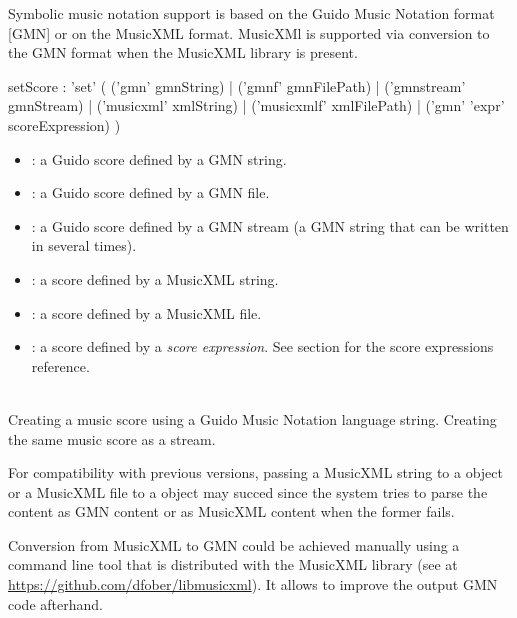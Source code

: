 \documentclass[a4paper,twoside]{report}
\begin{document}
Symbolic music notation support is based on the Guido Music Notation format [GMN] or on the MusicXML format. MusicXMl is supported via conversion to the GMN format when the MusicXML library is present.


\begin{rail}
setScore : 'set' (
	('gmn' gmnString) |
	('gmnf' gmnFilePath) |
	('gmnstream' gmnStream) |
	('musicxml' xmlString) |
	('musicxmlf' xmlFilePath) |
	('gmn' 'expr' scoreExpression)
)
\end{rail}

\begin{itemize}
\item {}: a Guido score defined by a GMN string.
\item {}: a Guido score defined by a GMN file.
\item {}: a Guido score defined by a GMN stream (a GMN string that can be written in several times).
\item {}: a score defined by a MusicXML string.
\item {}: a score defined by a MusicXML file.
\item {}: a score defined by a \emph{score expression}. See section  for the score expressions reference.
\end{itemize}

\example \\
Creating a music score using a Guido Music Notation language string.
Creating the same music score as a stream.
\sample{/ITL/scene/myObject set gmnstream "[ a";\\
/ITL/scene/myObject write "b";\\
/ITL/scene/myObject write "g";
}

\note{} For compatibility with previous versions, passing a MusicXML string to a  object or a MusicXML file to a  object may succed since the system tries to parse the content as GMN content or as MusicXML content when the former fails.

\note{} Conversion from MusicXML to GMN could be achieved manually using a command line tool that is distributed with the MusicXML library (see at \url{https://github.com/dfober/libmusicxml}). It allows to improve the output GMN code afterhand.
\end{document}
